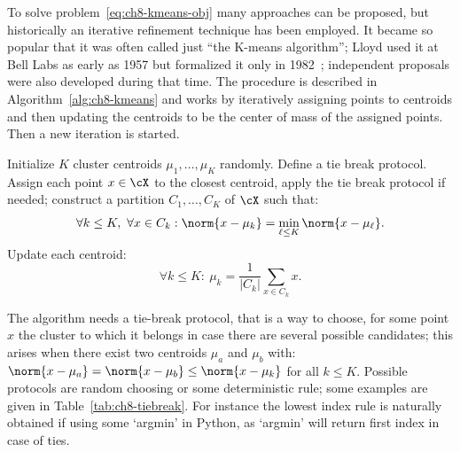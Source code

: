 To solve problem~\eqref{eq:ch8-kmeans-obj} many approaches can be proposed, but
historically an iterative refinement technique has been employed. It became so
popular that it was often called just ``the K-means algorithm''; Lloyd used it
at Bell Labs as early as 1957 but formalized it only in 1982~\cite{turinici12};
independent proposals were also developed during that time. The procedure is
described in Algorithm~\ref{alg:ch8-kmeans} and works by iteratively assigning
points to centroids and then updating the centroids to be the center of mass
of the assigned points. Then a new iteration is started.

\begin{algorithm}
\caption{K-Means Algorithm}\label{alg:ch8-kmeans}
\begin{algorithmic}[1]
\State Initialize $K$ cluster centroids $\mu_1, \ldots, \mu_K$ randomly.
Define a tie break protocol.
\Repeat
    \State Assign each point $x \in \cX$ to the closest centroid, apply the
    tie break protocol if needed; construct a partition $C_1, \ldots, C_K$ of
    $\cX$ such that:
    \begin{equation}\label{eq:ch8-assign}
    \forall k \le K,\ \forall x \in C_k : \norm{x - \mu_k}
    = \min_{\ell \le K} \norm{x - \mu_\ell}.
    \end{equation}
    \State Update each centroid:
    \begin{equation}\label{eq:ch8-update}
    \forall k \le K :\ \mu_k = \frac{1}{|C_k|} \sum_{x \in C_k} x.
    \end{equation}
\end{algorithmic}
\end{algorithm}

The algorithm needs a tie-break protocol, that is a way to choose, for some
point $x$ the cluster to which it belongs in case there are several possible
candidates; this arises when there exist two centroids $\mu_a$ and $\mu_b$
with: $\norm{x - \mu_a} = \norm{x - \mu_b} \le \norm{x - \mu_k}$ for all
$k \le K$. Possible protocols are random choosing or some deterministic rule;
some examples are given in Table~\ref{tab:ch8-tiebreak}. For instance the
lowest index rule is naturally obtained if using some `argmin' in Python, as
`argmin' will return first index in case of ties.

